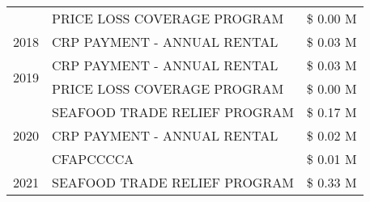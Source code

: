 \begin{tabular}{llr}
 & PRICE LOSS COVERAGE PROGRAM & \$ 0.00 M \\
\cline{1-3}
2018 & CRP PAYMENT - ANNUAL RENTAL & \$ 0.03 M \\
\cline{1-3}
\multirow[t]{2}{*}{2019} & CRP PAYMENT - ANNUAL RENTAL & \$ 0.03 M \\
 & PRICE LOSS COVERAGE PROGRAM & \$ 0.00 M \\
\cline{1-3}
\multirow[t]{3}{*}{2020} & SEAFOOD TRADE RELIEF PROGRAM & \$ 0.17 M \\
 & CRP PAYMENT - ANNUAL RENTAL & \$ 0.02 M \\
 & CFAPCCCCA & \$ 0.01 M \\
\cline{1-3}
2021 & SEAFOOD TRADE RELIEF PROGRAM & \$ 0.33 M \\
\cline{1-3}
\bottomrule
\end{tabular}
